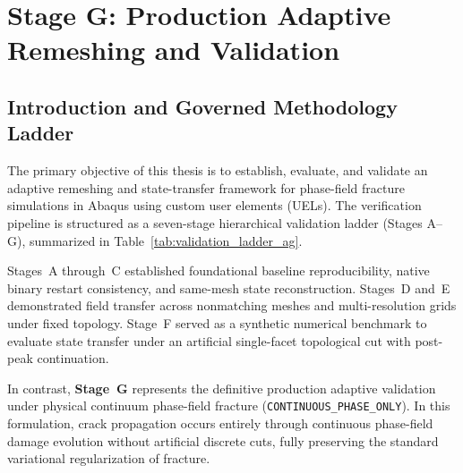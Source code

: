 \chapter{Stage G: Production Adaptive Remeshing and Validation}
\label{chap:stage_g_production_validation}

\section{Introduction and Governed Methodology Ladder}
The primary objective of this thesis is to establish, evaluate, and validate an adaptive remeshing and state-transfer framework for phase-field fracture simulations in Abaqus using custom user elements (UELs). The verification pipeline is structured as a seven-stage hierarchical validation ladder (Stages A--G), summarized in Table~\ref{tab:validation_ladder_ag}.

Stages~A through~C established foundational baseline reproducibility, native binary restart consistency, and same-mesh state reconstruction. Stages~D and~E demonstrated field transfer across nonmatching meshes and multi-resolution grids under fixed topology. Stage~F served as a synthetic numerical benchmark to evaluate state transfer under an artificial single-facet topological cut with post-peak continuation.

In contrast, \textbf{Stage~G} represents the definitive production adaptive validation under physical continuum phase-field fracture (\texttt{CONTINUOUS\_PHASE\_ONLY}). In this formulation, crack propagation occurs entirely through continuous phase-field damage evolution without artificial discrete cuts, fully preserving the standard variational regularization of fracture.

